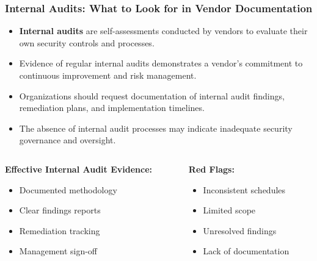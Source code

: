 \documentclass{beamer}
\begin{document}
\begin{frame}
    \frametitle{Internal Audits: What to Look for in Vendor Documentation}
    
    \begin{itemize}
        \item \textbf{Internal audits} are self-assessments conducted by vendors to evaluate their own security controls and processes.
        \item Evidence of regular internal audits demonstrates a vendor's commitment to continuous improvement and risk management.
        \item Organizations should request documentation of internal audit findings, remediation plans, and implementation timelines.
        \item The absence of internal audit processes may indicate inadequate security governance and oversight.
    \end{itemize}
    
    \begin{columns}
        \scriptsize
        \begin{column}{0.48\textwidth}
            \textbf{Effective Internal Audit Evidence:}
            \begin{itemize}
                \item Documented methodology
                \item Clear findings reports
                \item Remediation tracking
                \item Management sign-off
            \end{itemize}
        \end{column}
        \begin{column}{0.48\textwidth}
            \textbf{Red Flags:}
            \begin{itemize}
                \item Inconsistent schedules
                \item Limited scope
                \item Unresolved findings
                \item Lack of documentation
            \end{itemize}
        \end{column}
    \end{columns}
\end{frame}
\end{document}
